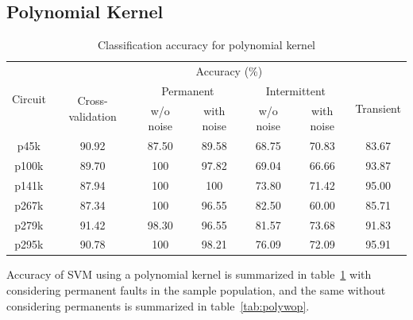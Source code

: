 \subsection{Polynomial Kernel}
\begin{table}[h]

	\captionsetup{justification=centering}
\begin{tabular}{ccccccc}
\hline
\multirow{3}{*}{Circuit} & \multicolumn{6}{c}{Accuracy (\%)}\\ \cline{2-7} 
                         & \multirow{2}{*}{Cross-validation} & \multicolumn{2}{c}{Permanent} & \multicolumn{2}{c}{Intermittent} & \multirow{2}{*}{Transient} \\ \cline{3-6}
                         &                                   & w/o noise     & with noise    & w/o noise      & with noise      &                            \\ \hline
p45k                     & 90.92                             & 87.50         & 89.58         & 68.75          & 70.83           & 83.67                      \\
p100k                    & 89.70                             & 100           & 97.82         & 69.04          & 66.66           & 93.87                      \\
p141k                    & 87.94                             & 100           & 100           & 73.80          & 71.42           & 95.00                      \\
p267k                    & 87.34                             & 100           & 96.55         & 82.50          & 60.00           & 85.71                      \\
p279k                    & 91.42                             & 98.30         & 96.55         & 81.57          & 73.68           & 91.83                      \\
p295k                    & 90.78                             & 100           & 98.21         & 76.09          & 72.09           & 95.91      \\
\hline                                                     
\end{tabular}
\caption {Classification accuracy for polynomial kernel}
\label{tab:polywp}
\end{table}

Accuracy of SVM using a polynomial kernel is summarized in table~\ref{tab:polywp} with considering permanent faults in the sample population, and the same without considering permanents is summarized in table~\ref{tab:polywop}.

